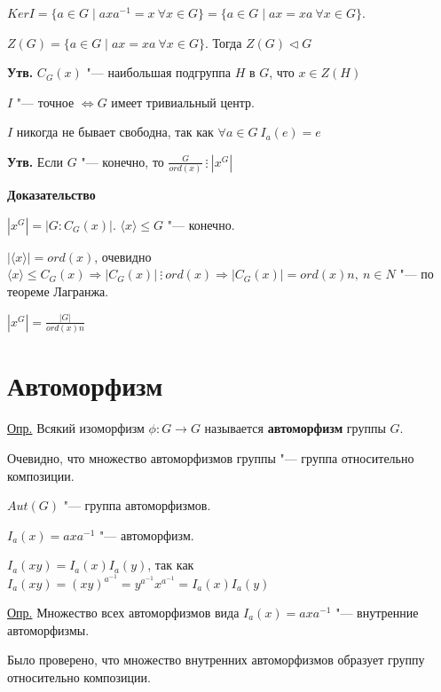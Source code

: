 \documentclass{article}
\begin{document}
$KerI = \{a \in G \mid axa^{-1} = x \  \forall x \in G\} = \{a \in G \mid ax = xa \  \forall x \in G\}$.

$Z(G) = \{a \in G \mid ax = xa \  \forall x \in G\}$. Тогда $Z(G) \triangleleft G$

\vspace{5pt}

\textbf{Утв.} $C_G(x)$ "--- наибольшая подгруппа $H$ в $G$, что $x \in Z(H)$

$I$ "--- точное $\Leftrightarrow G$ имеет тривиальный центр.

$I$ никогда не бывает свободна, так как $\forall a \in G \  I_a(e) = e$

\vspace{10pt}

\textbf{Утв.} Если $G$ "--- конечно, то $\frac{G}{ord(x)} \  \vdots \  |x^G|$

\vspace{5pt}

\textbf{Доказательство}

$|x^G| = |G:C_G(x)|$. $\langle x \rangle \leq G$ "--- конечно.

$|\langle x \rangle| = ord(x)$, очевидно $\langle x \rangle \leq C_G(x) \Rightarrow |C_G(x)| \  \vdots \  ord(x) \Rightarrow |C_G(x)| = ord(x)n, \  n \in N$ "--- по теореме Лагранжа.

$|x^G| = \frac{|G|}{ord(x)n}$

\section{Автоморфизм}

\underline{Опр.} Всякий изоморфизм $\phi: G \rightarrow G$ называется \textbf{автоморфизм} группы $G$.

Очевидно, что множество автоморфизмов группы "--- группа относительно композиции.

$Aut(G)$ "--- группа автоморфизмов.

$I_a(x) = axa^{-1}$ "--- автоморфизм.

$I_a(xy) = I_a(x)I_a(y)$, так как $I_a(xy) = (xy)^{a^{-1}} = y^{a^{-1}}x^{a^{-1}} = I_a(x)I_a(y)$ 

\vspace{5pt}

\underline{Опр.} Множество всех автоморфизмов вида $I_a(x) = axa^{-1}$ "--- внутренние автоморфизмы.

\vspace{5pt}

Было проверено, что множество внутренних автоморфизмов образует группу относительно композиции.
\end{document}

